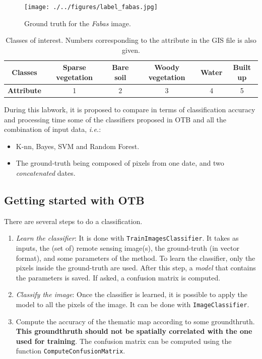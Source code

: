 \documentclass[a4paper,11pt,DIV=18]{scrartcl}
\begin{document}
\begin{figure}[htbp]
\centering
\texttt{[image: ./../figures/label\_fabas.jpg]}
\caption{\label{fig:org6f5fbfd}
Ground truth for the \emph{Fabas} image.}
\end{figure}

\begin{table}[htbp]
\caption{\label{tab:org8f0ee1b}
Classes of interest. Numbers corresponding to the attribute in the GIS file is also given.}
\centering
\begin{tabular}{cccccc}
\toprule
\textbf{Classes} & Sparse vegetation & Bare soil & Woody vegetation & Water & Built up\\
\midrule
\textbf{Attribute} & 1 & 2 & 3 & 4 & 5\\
\bottomrule
\end{tabular}
\end{table}

During  this  labwork,   it  is  proposed  to  compare   in  terms  of
classification accuracy  and processing  time some of  the classifiers
proposed in OTB and all the combination of input data, \emph{i.e.}:
\begin{itemize}
\item K-nn, Bayes, SVM and Random Forest.
\item The ground-truth  being composed  of pixels from  one date,  and two
\emph{concatenated} dates.
\end{itemize}
\subsection{Getting started with OTB}
\label{sec:orgf1bc4e0}
There are several steps to do a classification.
\begin{enumerate}
\item \emph{Learn   the    classifier}:   It    is   done    with
\texttt{TrainImagesClassifier}.   It takes  as inputs,  the (set  of) remote
sensing  image(s), the  ground-truth (in  vector format),  and some
parameters of the method.  To learn the classifier, only the pixels
inside the  ground-truth are  used. After this  step, a  \emph{model} that
contains the parameters  is saved. If asked, a  confusion matrix is
computed.
\item \emph{Classify the image}: Once the  classifier is learned, it is possible
to apply the model to all the  pixels of the image.  It can be done
with \texttt{ImageClassifier}.
\item Compute the  accuracy of  the  thematic map  according to  some
groundthruth. \textbf{This groundthruth should  not be spatially correlated
with  the one  used  for  training}.  The  confusion  matrix can  be
computed using the function \texttt{ComputeConfusionMatrix}.
\end{enumerate}
\end{document}
